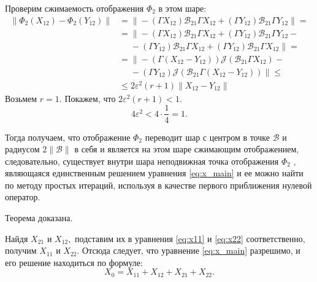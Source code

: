 \begin{enumerate}
Проверим сжимаемость отображения $\Phi_2$ в этом шаре:
\begin{align*}
\|\Phi_2(X_{12}) - \Phi_2(Y_{12}) \| &= \| -(\Gamma X_{12})\mathcal{B}_{21}\Gamma X_{12} + (\Gamma Y_{12})\mathcal{B}_{21}\Gamma Y_{12}\|  = \\ 
&= \| -(\Gamma X_{12})\mathcal{B}_{21}\Gamma X_{12} + (\Gamma Y_{12})\mathcal{B}_{21}\Gamma Y_{12} - \\
& \phantom{=} -(\Gamma Y_{12})\mathcal{B}_{21}\Gamma X_{12} + (\Gamma Y_{12})\mathcal{B}_{21}\Gamma X_{12}\| = \\
 &= \| - (\Gamma (X_{12} - Y_{12})) \mathcal{J}(\mathcal{B}_{21}\Gamma X_{12}) - \\
 & \phantom{=} - (\Gamma Y_{12})\mathcal{J}(\mathcal{B}_{21}\Gamma (X_{12} - Y_{12})) \| \leqslant \\
 &\leqslant 2\varepsilon ^2 (r + 1)\| X_{12} - Y_{12} \| 
\end{align*}
Возьмем $r = 1.$ Покажем, что $2\varepsilon ^2 (r + 1) < 1.$
$$
4\varepsilon ^2 < 4 \cdot \frac{1}{4} = 1.
$$

Тогда получаем, что отображение $\Phi_2$ переводит шар с центром в точке $\mathcal{B}$ и радиусом $2\|\mathcal{B}\|$ в себя и является на этом шаре сжимающим отображением, следовательно, существует внутри шара неподвижная точка отображения $\Phi_2$ , являющаяся единственным решением уравнения \eqref{eq:x_main} и ее можно найти по методу простых итераций, используя в качестве первого приближения нулевой оператор.   
\end{enumerate}
Теорема доказана.
\hfill

Найдя $X_{21}$ и $X_{12},$ подставим их в уравнения \eqref{eq:x11} и \eqref{eq:x22} соответственно, получим $X_{11}$ и $X_{22}.$ Отсюда следует, что уравнение \eqref{eq:x_main} разрешимо, и его решение находиться по формуле:
$$
	X_0 = X_{11} + X_{12} + X_{21} + X_{22}.
$$ 